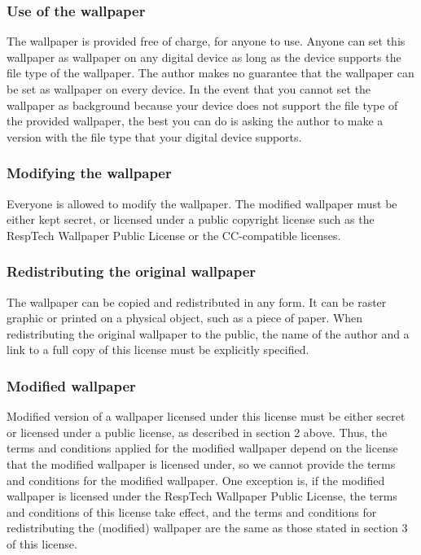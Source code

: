 \documentclass[]{article}
\begin{document}
\hypertarget{use-of-the-wallpaper}{%
\subsubsection{Use of the wallpaper}\label{use-of-the-wallpaper}}

The wallpaper is provided free of charge, for anyone to use. Anyone can
set this wallpaper as wallpaper on any digital device as long as the
device supports the file type of the wallpaper. The author makes no
guarantee that the wallpaper can be set as wallpaper on every device. In
the event that you cannot set the wallpaper as background because your
device does not support the file type of the provided wallpaper, the
best you can do is asking the author to make a version with the file
type that your digital device supports.

\hypertarget{modifying-the-wallpaper}{%
\subsubsection{Modifying the wallpaper}\label{modifying-the-wallpaper}}

Everyone is allowed to modify the wallpaper. The modified wallpaper must
be either kept secret, or licensed under a public copyright license such
as the RespTech Wallpaper Public License or the CC-compatible licenses.

\hypertarget{redistributing-the-original-wallpaper}{%
\subsubsection{Redistributing the original
wallpaper}\label{redistributing-the-original-wallpaper}}

The wallpaper can be copied and redistributed in any form. It can be
raster graphic or printed on a physical object, such as a piece of
paper. When redistributing the original wallpaper to the public, the
name of the author and a link to a full copy of this license must be
explicitly specified.

\hypertarget{modified-wallpaper}{%
\subsubsection{Modified wallpaper}\label{modified-wallpaper}}

Modified version of a wallpaper licensed under this license must be
either secret or licensed under a public license, as described in
section 2 above. Thus, the terms and conditions applied for the modified
wallpaper depend on the license that the modified wallpaper is licensed
under, so we cannot provide the terms and conditions for the modified
wallpaper. One exception is, if the modified wallpaper is licensed under
the RespTech Wallpaper Public License, the terms and conditions of this
license take effect, and the terms and conditions for redistributing the
(modified) wallpaper are the same as those stated in section 3 of this
license.
\end{document}
